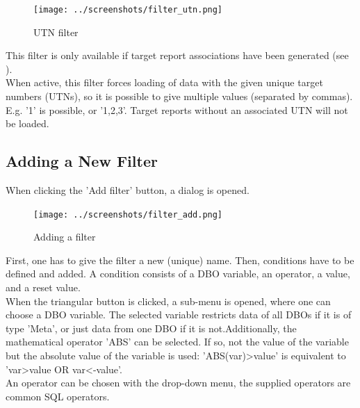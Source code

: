 \begin{figure}[H]
  \center
    \texttt{[image: ../screenshots/filter\_utn.png]}
  \caption{UTN filter}
\end{figure}

This filter is only available if target report associations have been generated (see ). \\

When active, this filter forces loading of data with the given unique target numbers (UTNs), so it is possible to give multiple values (separated by commas). E.g. '1' is possible, or '1,2,3'. Target reports without an associated UTN will not be loaded. \\

\subsection{Adding a New Filter}
When clicking the 'Add filter' button, a dialog is opened.

\begin{figure}[H]
  \center
    \texttt{[image: ../screenshots/filter\_add.png]}
  \caption{Adding a filter}
  \label{fig:filter_add}
\end{figure}

First, one has to give the filter a new (unique) name. Then, conditions have to be defined and added. A condition consists of a DBO variable, an operator, a value, and a reset value. \\

When the triangular button is clicked, a sub-menu is opened, where one can choose a DBO variable. The selected variable restricts data of all DBOs if it is of type 'Meta', or just data from one DBO if it is not.Additionally, the mathematical operator 'ABS' can be selected. If so, not the value of the variable but the absolute value of the variable is used: 'ABS(var)>value' is equivalent to 'var>value OR var<-value'. \\

An operator can be chosen with the drop-down menu, the supplied operators are common SQL operators.

